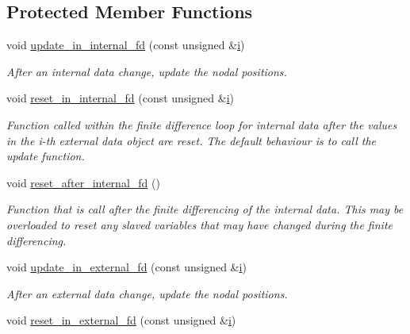 \subsection*{Protected Member Functions}
\begin{DoxyCompactItemize}
\item 
void \hyperlink{classoomph_1_1FSIWallElement_ae3b3a1cbaa1b9f467a25f41307135873}{update\+\_\+in\+\_\+internal\+\_\+fd} (const unsigned \&\hyperlink{cfortran_8h_adb50e893b86b3e55e751a42eab3cba82}{i})
\begin{DoxyCompactList}\small\item\em After an internal data change, update the nodal positions. \end{DoxyCompactList}\item 
void \hyperlink{classoomph_1_1FSIWallElement_aed714993ced295b7ddb5f014ffc2ba6a}{reset\+\_\+in\+\_\+internal\+\_\+fd} (const unsigned \&\hyperlink{cfortran_8h_adb50e893b86b3e55e751a42eab3cba82}{i})
\begin{DoxyCompactList}\small\item\em Function called within the finite difference loop for internal data after the values in the i-\/th external data object are reset. The default behaviour is to call the update function. \end{DoxyCompactList}\item 
void \hyperlink{classoomph_1_1FSIWallElement_ab0229ea34afffcd6d85a10dafa0b7d10}{reset\+\_\+after\+\_\+internal\+\_\+fd} ()
\begin{DoxyCompactList}\small\item\em Function that is call after the finite differencing of the internal data. This may be overloaded to reset any slaved variables that may have changed during the finite differencing. \end{DoxyCompactList}\item 
void \hyperlink{classoomph_1_1FSIWallElement_a8274e2b48101edd84f33b6368bc1c90d}{update\+\_\+in\+\_\+external\+\_\+fd} (const unsigned \&\hyperlink{cfortran_8h_adb50e893b86b3e55e751a42eab3cba82}{i})
\begin{DoxyCompactList}\small\item\em After an external data change, update the nodal positions. \end{DoxyCompactList}\item 
void \hyperlink{classoomph_1_1FSIWallElement_afbfc79cddd641419f297680674daecfd}{reset\+\_\+in\+\_\+external\+\_\+fd} (const unsigned \&\hyperlink{cfortran_8h_adb50e893b86b3e55e751a42eab3cba82}{i})

\end{DoxyCompactItemize}

